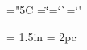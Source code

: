 %
\def\textdegree{$^\circ$}

%
\ifx\Orb\undefined
\def\Orb{\mathhexbox20D}
\fi

\chardef\quotedblleft="5C
\chardef\quotedblright=`\"
\chardef\quoteleft=`\`
\chardef\quoteright=`\'



\newskip\titlepagetopglue \titlepagetopglue = 1.5in
\newskip\titlepagebottomglue \titlepagebottomglue = 2pc

\newif\ifseenauthor
\newif\iffinishedtitlepage

%
\newif\ifsetcontentsaftertitlepage
 \let\setcontentsaftertitlepage = \setcontentsaftertitlepagetrue
\newif\ifsetshortcontentsaftertitlepage
 \let\setshortcontentsaftertitlepage = \setshortcontentsaftertitlepagetrue

\parseargdef{}

\envdef\titlepage{%
  \begingroup
    \parindent=0pt \textfonts
    \vglue\titlepagetopglue
    \finishedtitlepagetrue
    \let\oldpage = \page
    \def\page{%
      \iffinishedtitlepage\else
	 \finishtitlepage
      \fi
      \let\page = \oldpage
      \page
      \null
    }%
}

\def\Etitlepage{%
    \iffinishedtitlepage\else
	\finishtitlepage
    \fi
    \oldpage
  \endgroup
  \HEADINGSon
  \ifsetshortcontentsaftertitlepage
    \shortcontents
    \contents
    \global\let\shortcontents = \relax
    \global\let\contents = \relax
  \fi
  \ifsetcontentsaftertitlepage
    \contents
    \global\let\contents = \relax
    \global\let\shortcontents = \relax
  \fi
}

